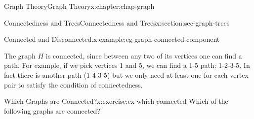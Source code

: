 \documentclass[oneside,10pt,]{book}
\numberwithin{equation}{section}
\begin{document}
\begin{chapterptx}{Graph Theory}{}{Graph Theory}{}{}{x:chapter:chap-graph}
\begin{sectionptx}{Connectedness and Trees}{}{Connectedness and Trees}{}{}{x:section:sec-graph-trees}
\begin{example}{Connected and Disconnected.}{x:example:eg-graph-connected-component}
\begin{sidebyside}{1}{0.4}{0.4}{0}
\begin{sbspanel}{0.2}
{
}%
\end{sbspanel}%
\end{sidebyside}%
\par
The graph \(H\) is connected, since between any two of its vertices one can find a path. For example, if we pick vertices 1 and 5, we can find a 1-5 path: 1-2-3-5. In fact there is another path (1-4-3-5) but we only need at least one for each vertex pair to satisfy the condition of connectedness.%
\end{example}
\begin{inlineexercise}{Which Graphs are Connected?}{x:exercise:ex-which-connected}%
Which of the following graphs are connected?%
\begin{sidebyside}{3}{0.0916666666666667}{0.0916666666666667}{0.183333333333333}%
\begin{sbspanel}{0.15}%
%
\end{sbspanel}%
\begin{sbspanel}{0.15}%
\end{sbspanel}
\end{sidebyside}
\end{inlineexercise}
\end{sectionptx}
\end{chapterptx}
\end{document}
